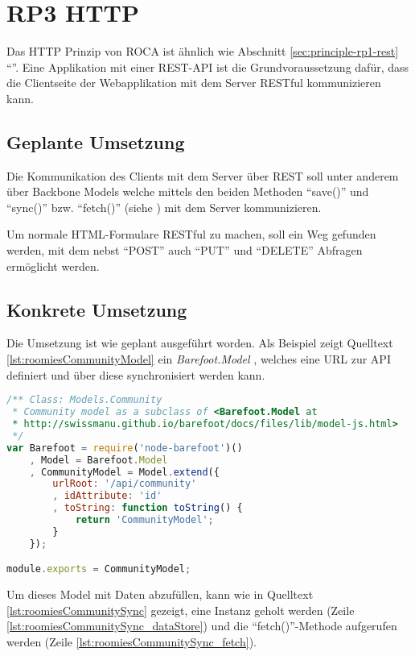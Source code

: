 \section{RP3 HTTP}
\label{sec:principle-rp3-http}

Das HTTP Prinzip von ROCA ist ähnlich wie Abschnitt \ref{sec:principle-rp1-rest} ``''.
Eine Applikation mit einer \gls{REST}-API ist die Grundvoraussetzung dafür, dass die Clientseite der Webapplikation mit dem Server \gls{RESTful} kommunizieren kann.

\subsection*{Geplante Umsetzung}
Die Kommunikation des Clients mit dem Server über \gls{REST} soll unter anderem über Backbone Models welche mittels den beiden Methoden ``save()'' und ``sync()'' bzw. ``fetch()'' (siehe \cite{BackboneSync}) mit dem Server kommunizieren.

Um normale HTML-Formulare \gls{RESTful} zu machen, soll ein Weg gefunden werden, mit dem nebst ``POST'' auch ``PUT'' und ``DELETE'' Abfragen ermöglicht werden.

\subsection*{Konkrete Umsetzung}
Die Umsetzung ist wie geplant ausgeführt worden. Als Beispiel zeigt Quelltext \ref{lst:roomiesCommunityModel} ein \emph{Barefoot.Model} \cite{barefootModel}, welches eine URL zur API definiert und über diese synchronisiert werden kann.

\begin{lstlisting}[language=JavaScript, caption=Community Model \cite{roomiesCommunityModel}, label=lst:roomiesCommunityModel]
/** Class: Models.Community
 * Community model as a subclass of <Barefoot.Model at
 * http://swissmanu.github.io/barefoot/docs/files/lib/model-js.html>
 */
var Barefoot = require('node-barefoot')()
	, Model = Barefoot.Model
	, CommunityModel = Model.extend({
		urlRoot: '/api/community'
		, idAttribute: 'id'
		, toString: function toString() {
			return 'CommunityModel';
		}
	});

module.exports = CommunityModel;
\end{lstlisting}

Um dieses Model mit Daten abzufüllen, kann wie in Quelltext \ref{lst:roomiesCommunitySync} gezeigt, eine Instanz geholt werden (Zeile \ref{lst:roomiesCommunitySync_dataStore}) und die ``fetch()''-Methode aufgerufen werden (Zeile \ref{lst:roomiesCommunitySync_fetch}).

